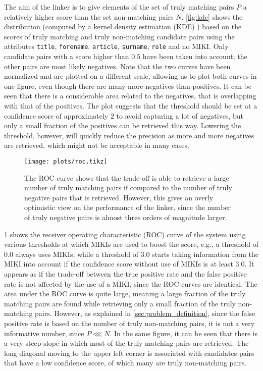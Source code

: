 The aim of the linker is to give elements of the set of truly matching pairs $P$ a relatively higher score than the set non-matching pairs $N$.
\cref{fig:kde} shows the distribution (computed by a kernel density estimation (KDE) \citep{Rosenblatt1956}) based on the scores of truly matching and truly non-matching candidate pairs using the attributes \texttt{title}, \texttt{forename}, \texttt{article}, \texttt{surname}, \texttt{role} and no MIKI.
Only candidate pairs with a score higher than $0.5$ have been taken into account; the other pairs are most likely negatives.
Note that the two curves have been normalized and are plotted on a different scale, allowing us to plot both curves in one figure, even though there are many more negatives than positives.
It can be seen that there is a considerable area related to the negatives, that is overlapping with that of the positives.
The plot suggests that the threshold should be set at a confidence score of approximately $2$ to avoid capturing a lot of negatives, but only a small fraction of the positives can be retrieved this way.
Lowering the threshold, however, will quickly reduce the precision as more and more negatives are retrieved, which might not be acceptable in many cases.

\begin{figure}
    \centering
    \texttt{[image: plots/roc.tikz]}
    \caption{The ROC curve shows that the trade-off is able to retrieve a large number of truly matching pairs if compared to the number of truly negative pairs that is retrieved. However, this gives an overly optimistic view on the performance of the linker, since the number of truly negative pairs is almost three orders of magnitude larger.}
    \label{fig:roc}
\end{figure}

\cref{fig:roc} shows the receiver operating characteristic (ROC) curve of the system using various thresholds at which MIKIs are used to boost the score, e.g., a threshold of $0.0$ always uses MIKIs, while a threshold of $3.0$ starts taking information from the MIKI into account if the confidence score without use of MIKIs is at least $3.0$.
It appears as if the trade-off between the true positive rate and the false positive rate is not affected by the use of a MIKI, since the ROC curves are identical.
The area under the ROC curve is quite large, meaning a large fraction of the truly matching pairs are found while retrieving only a small fraction of the truly non-matching pairs.
However, as explained in \cref{sec:problem_definition}, since the false positive rate is based on the number of truly non-matching pairs, it is not a very informative number, since $P \lll N$.
In the same figure, it can be seen that there is a very steep slope in which most of the truly matching pairs are retrieved.
The long diagonal moving to the upper left corner is associated with candidates pairs that have a low confidence score, of which many are truly non-matching pairs.

